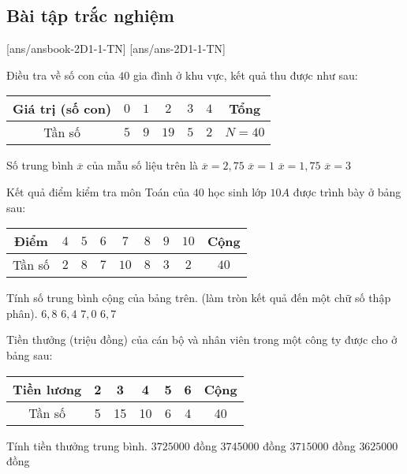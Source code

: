 \subsection{Bài tập trắc nghiệm}
[ans/ansbook-2D1-1-TN]
[ans/ans-2D1-1-TN]
\setcounter{ex}{0}
\begin{ex}%
	Điều tra về số con của $40$ gia đình ở khu vực, kết quả thu được như sau:
	\begin{center}
		\begin{tabular}{|c|c|c|c|c|c|c|}
			\hline 
			Giá trị (số con) & $0$ &$1$ & $2$ &$3$ & $4$ & Tổng \\ 
			\hline 
			Tần số & $5$ & $9$ & $19$ & $5$ & $2$ & $N=40$ \\ 
			\hline 
		\end{tabular}
	\end{center}
	Số trung bình $\overline{x}$ của mẫu số liệu trên là
	\choice
	{$\overline{x}=2{,}75$}
	{$\overline{x}=1$}
	{\True $\overline{x}=1{,}75$}
	{$\overline{x}=3$}
\end{ex} 
\begin{ex}%
	Kết quả điểm kiểm tra môn Toán của $40$ học sinh lớp $10A$ được trình bày ở bảng sau:
	\begin{center}
		\begin{tabular}{|c|c|c|c|c|c|c|c|c|}
			\hline 
			Điểm&$4$  &$5$  &$6$  &$7$  &$8$  &$9$  &$10$  &Cộng  \\ 
			\hline 
			Tần số&$2$  &$8$  &$7$  &$10$  &$8$  &$3$  &$2$  &$40$  \\ 
			\hline 
		\end{tabular} 
	\end{center}
	Tính số trung bình cộng của bảng trên. (làm tròn kết quả đến một chữ số thập phân).
	\choice
	{\True $6,\!8$}
	{$6,\!4$}
	{$7,\!0$}
	{$6,\!7$}
\end{ex}
\begin{ex}%
	Tiền thưởng (triệu đồng) của cán bộ và nhân viên trong một công ty được cho ở bảng sau:
	\begin{center}
		\begin{tabular}{|c|c|c|c|c|c|c|}
			\hline 
			Tiền lương	&2	&3	&4	&5	&6	&Cộng\\
			\hline
			Tần số	&5	&15	&10	&6	&4	&40\\
			\hline 
		\end{tabular}
	\end{center}
	Tính tiền thưởng trung bình.
	\choice
	{\True $3725000$ đồng}
	{$3745000$ đồng}
	{$3715000$ đồng}
	{$3625000$ đồng}
\end{ex}
